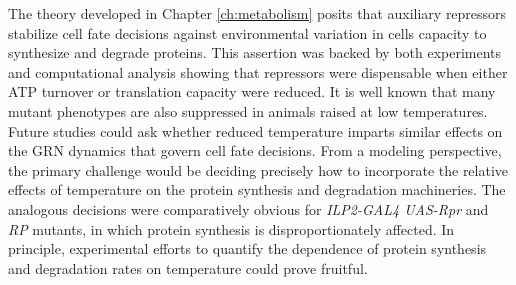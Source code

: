 The theory developed in Chapter \ref{ch:metabolism} posits that auxiliary repressors stabilize cell fate decisions against environmental variation in cells capacity to synthesize and degrade proteins. This assertion was backed by both experiments and computational analysis showing that repressors were dispensable when either ATP turnover or translation capacity were reduced. It is well known that many mutant phenotypes are also suppressed in animals raised at low temperatures. Future studies could ask whether reduced temperature imparts similar effects on the GRN dynamics that govern cell fate decisions. From a modeling perspective, the primary challenge would be deciding precisely how to incorporate the relative effects of temperature on the protein synthesis and degradation machineries. The analogous decisions were comparatively obvious for \textit{ILP2-GAL4 UAS-Rpr} and \textit{RP} mutants, in which protein synthesis is disproportionately affected. In principle, experimental efforts to quantify the dependence of protein synthesis and degradation rates on temperature could prove fruitful.

